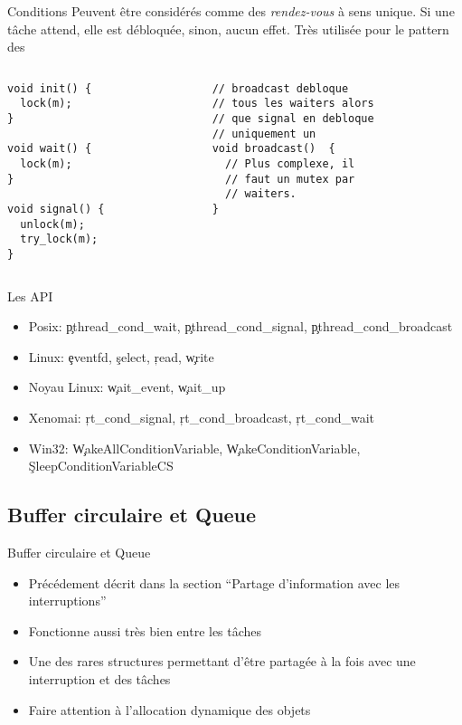 \begin{frame}[fragile]{Conditions}
  Peuvent  être   considérés  comme  des   \emph{rendez-vous}  à  sens
  unique. Si une tâche attend, elle est débloquée, sinon, aucun effet.
  Très utilisée pour le pattern des 
  \begin{columns}
    \begin{column}{5cm}
      \begin{lstlisting} 
void init() {
  lock(m);
}

void wait() {
  lock(m);
}

void signal() {
  unlock(m);
  try_lock(m);
}
      \end{lstlisting}
    \end{column}
    \begin{column}{5.5cm}
      \begin{lstlisting} 
// broadcast debloque
// tous les waiters alors
// que signal en debloque
// uniquement un
void broadcast()  {
  // Plus complexe, il
  // faut un mutex par
  // waiters. 
}
      \end{lstlisting} 
    \end{column}
  \end{columns}
\end{frame} 

\begin{frame}[fragile=singleslide]{Les API}
  \begin{itemize} 
  \item    Posix:    \c{pthread_cond_wait},   \c{pthread_cond_signal},
    \c{pthread_cond_broadcast}
  \item Linux: \c{eventfd}, \c{select}, \c{read}, \c{write}
  \item Noyau Linux: \c{wait_event}, \c{wait_up}
  \item Xenomai: \c{rt_cond_signal}, \c{rt_cond_broadcast}, \c{rt_cond_wait}
  \item              Win32:              \c{WakeAllConditionVariable},
    \c{WakeConditionVariable}, \c{SleepConditionVariableCS}
  \end{itemize} 
\end{frame} 

\subsection{Buffer circulaire et Queue}

\begin{frame}[fragile]{Buffer circulaire et Queue}
  \begin{itemize} 
  \item  Précédement décrit dans  la section  ``Partage d'information
    avec les interruptions''
  \item Fonctionne aussi très bien entre les tâches
  \item Une  des rares structures  permettant d'être partagée à  la fois
    avec une interruption et des tâches
  \item Faire attention à l'allocation dynamique des objets
  \end{itemize}
\end{frame} 

